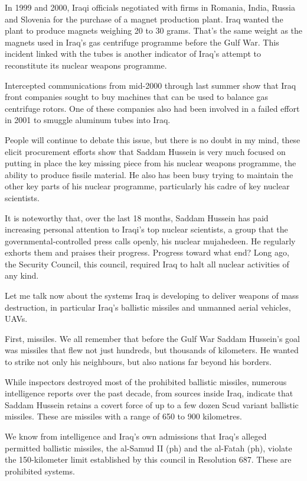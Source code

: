 \documentclass[10pt,a4paper]{article}
\begin{document}
In 1999 and 2000, Iraqi officials negotiated with firms in Romania, India, Russia and Slovenia for the purchase of a magnet production plant. Iraq wanted the plant to produce magnets weighing 20 to 30 grams. That's the same weight as the magnets used in Iraq's gas centrifuge programme before the Gulf War. This incident linked with the tubes is another indicator of Iraq's attempt to reconstitute its nuclear weapons programme.

Intercepted communications from mid-2000 through last summer show that Iraq front companies sought to buy machines that can be used to balance gas centrifuge rotors. One of these companies also had been involved in a failed effort in 2001 to smuggle aluminum tubes into Iraq.

People will continue to debate this issue, but there is no doubt in my mind, these elicit procurement efforts show that Saddam Hussein is very much focused on putting in place the key missing piece from his nuclear weapons programme, the ability to produce fissile material. He also has been busy trying to maintain the other key parts of his nuclear programme, particularly his cadre of key nuclear scientists.

It is noteworthy that, over the last 18 months, Saddam Hussein has paid increasing personal attention to Iraqi's top nuclear scientists, a group that the governmental-controlled press calls openly, his nuclear mujahedeen. He regularly exhorts them and praises their progress. Progress toward what end? Long ago, the Security Council, this council, required Iraq to halt all nuclear activities of any kind.

Let me talk now about the systems Iraq is developing to deliver weapons of mass destruction, in particular Iraq's ballistic missiles and unmanned aerial vehicles, UAVs.

First, missiles. We all remember that before the Gulf War Saddam Hussein's goal was missiles that flew not just hundreds, but thousands of kilometers. He wanted to strike not only his neighbours, but also nations far beyond his borders.

While inspectors destroyed most of the prohibited ballistic missiles, numerous intelligence reports over the past decade, from sources inside Iraq, indicate that Saddam Hussein retains a covert force of up to a few dozen Scud variant ballistic missiles. These are missiles with a range of 650 to 900 kilometres.

We know from intelligence and Iraq's own admissions that Iraq's alleged permitted ballistic missiles, the al-Samud II (ph) and the al-Fatah (ph), violate the 150-kilometer limit established by this council in Resolution 687. These are prohibited systems.
\end{document}
